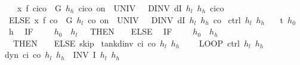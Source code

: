 \documentclass[envcountsame,envcountsect]{llncs}
\begin{document}
\begin{example}
\begin{isabellebody}
\ \ \ \ x{\isasymacute}{\isacharequal}\ f\ {\isacharparenleft}c\isactrlsub i{\isacharminus}c\isactrlsub o{\isacharparenright}\ {\isacharampersand}\ G\ $h_h$\ {\isacharparenleft}c\isactrlsub i{\isacharminus}c\isactrlsub o{\isacharparenright}\ on\ {\isacharbraceleft}{}{\isachardot}{\isachardot}{\isasymtau}{\isacharbraceright}\ UNIV\ {\isacharat}\ {}\ DINV\ {\isacharparenleft}dI\ $h_l$\ $h_h$\ {\isacharparenleft}c\isactrlsub i{\isacharminus}c\isactrlsub o{\isacharparenright}{\isacharparenright}\isanewline
\ \ ELSE\ x{\isasymacute}{\isacharequal}\ f\ {\isacharparenleft}{\isacharminus}c\isactrlsub o{\isacharparenright}\ {\isacharampersand}\ G\ $h_l$\ {\isacharparenleft}{\isacharminus}c\isactrlsub o{\isacharparenright}\ on\ {\isacharbraceleft}{}{\isachardot}{\isachardot}{\isasymtau}{\isacharbraceright}\ UNIV\ {\isacharat}\ {}\ DINV\ {\isacharparenleft}dI\ $h_l$\ $h_h$\ {\isacharparenleft}{\isacharminus}c\isactrlsub o{\isacharparenright}{\isacharparenright}{\isachardoublequoteclose}\isanewline
\isanewline
{}\
{\isachardoublequoteopen}ctrl\ $h_l$\ $h_h$\ {\isasymequiv}\isanewline
\ \ {\isacharparenleft}t\ {\isacharcolon}{\isacharcolon}{\isacharequal}{}{\isacharparenright}{\isacharsemicolon}{\isacharparenleft}$h_0$\ {\isacharcolon}{\isacharcolon}{\isacharequal}\ h{\isacharparenright}{\isacharsemicolon}\isanewline
\ \ {\isacharparenleft}IF\ {\isacharparenleft}{\isasympi}\ {\isacharequal}\ {\isadigit{0}}\ {\isasymand}\ $h_0$\ {\isasymle}\ $h_l$\ {\isacharplus}\ {}{\isacharparenright}\ THEN\ {\isacharparenleft}{\isasympi}\ {\isacharcolon}{\isacharcolon}{\isacharequal}\ {}{\isacharparenright}\ ELSE\isanewline
\ \ {\isacharparenleft}IF\ {\isacharparenleft}{\isasympi}\ {\isacharequal}\ {\isadigit{1}}\ {\isasymand}\ $h_0$\ {\isasymge}\ $h_h$\ {\isacharminus}\ {\isadigit{1}}{\isacharparenright}\ THEN\ {\isacharparenleft}{\isasympi}\ {\isacharcolon}{\isacharcolon}{\isacharequal}\ {\isadigit{0}}{\isacharparenright}\ ELSE\ skip{\isacharparenright}{\isacharparenright}{\isachardoublequoteclose}\isanewline
\isanewline
{}\isamarkupfalse%
\ {\isachardoublequoteopen}tank{\isacharunderscore}dinv\ c\isactrlsub i\ c\isactrlsub o\ $h_l$\ $h_h$\ {\isasymtau}\ {\isasymequiv}\isanewline 
\ \ LOOP\ {\isacharparenleft}ctrl\ $h_l$\ $h_h${\isacharsemicolon}\ dyn\ c\isactrlsub i\ c\isactrlsub o\ $h_l$\ $h_h$\ {\isasymtau}{\isacharparenright}\ INV\ {\isacharparenleft}I\ $h_l$\ $h_h${\isacharparenright}{\isachardoublequoteclose}\isanewline
\end{isabellebody}


\end{example}
\end{document}
